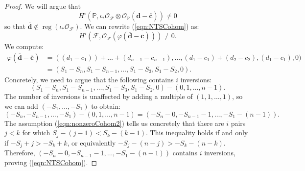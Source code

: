 \documentclass[10pt,a4paper]{amsart}
\newcommand{\calF}{{\mathcal{F}}}
\newcommand{\calO}{{\mathcal{O}}}
\newcommand{\reg}{\operatorname{reg}}
\begin{document}
\begin{proof}
    We will argue that
    \begin{equation}\label{eqn:NTSCohom}
        H^i(\mathbb P,\iota_*\calO_{\calF}\otimes \calO_{\mathbb P}(\overline{\mathbf d}-\overline{\mathbf c})) \neq 0
    \end{equation}
    so that $\mathbf{\overline d} \notin \reg(\iota_*\calO_{\calF})$.  We can rewrite (\ref{eqn:NTSCohom}) as:
    \[
    H^i(\calF,\calO_{\calF}(\varphi(\overline{\mathbf d}-\overline{\mathbf c}))) \neq 0.
    \]
    We compute:
    \begin{align*}
        \varphi(\overline{\mathbf d}-\overline{\mathbf c}) &= ((d_1-c_1))+\ldots+(d_{n-1}-c_{n-1}),\ldots, (d_1-c_1)+(d_2-c_2),(d_1-c_1),0)\\
        &= (S_1-S_n,S_1-S_{n-1},\ldots,S_1-S_3,S_1-S_2,0).
    \end{align*}
    Concretely, we need to argue that the following contains $i$ inversions:
    \[
    (S_1-S_n,S_1-S_{n-1},\ldots,S_1-S_3,S_1-S_2,0) - (0,1,\ldots,n-1).
    \]
    The number of inversions is unaffected by adding a multiple of $(1,1,\ldots,1)$, so we can add $(-S_1,\ldots,-S_1)$ to obtain:
    \[
    (-S_n,-S_{n-1},\ldots,-S_1) - (0,1,\ldots,n-1) = (-S_n - 0, -S_{n-1}-1,\ldots, -S_1-(n-1)).
    \]
    The assumption (\ref{eqn:nonzeroCohom2}) tells us concretely that there are $i$ pairs $j<k$ for which $S_j-(j-1)<S_k-(k-1)$.  This inequality holds if and only if $-S_j+j > -S_k + k$, or equivalently $-S_j-(n-j) > -S_k-(n-k)$.  Therefore, $(-S_n - 0, -S_{n-1}-1,\ldots, -S_1-(n-1))$ contains $i$ inversions, proving (\ref{eqn:NTSCohom}).
\end{proof}
\end{document}
